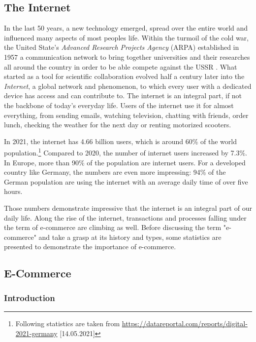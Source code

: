 \subsection{The Internet}
\label{chapter:internet}

In the last 50 years, a new technology emerged, spread over the entire world and influenced many aspects of most peoples life.
Within the turmoil of the cold war, the United State's \textit{Advanced Research Projects Agency} (ARPA) established in 1957 a communication network to bring together universities and their researches all around the country in order to be able compete against the USSR \cite{2011Cohen}.
What started as a tool for scientific collaboration evolved half a century later into the \textit{Internet}, a global network and phenomenon, to which every user with a dedicated device has access and can contribute to.
The internet is an integral part, if not the backbone of today's everyday life.
Users of the internet use it for almost everything, from sending emails, watching television, chatting with friends,  order lunch, checking the weather for the next day or renting motorized scooters.

In 2021, the internet has 4.66 billion users, which is around 60\% of the world population.\footnote{Following statistics are taken from \url{https://datareportal.com/reports/digital-2021-germany} [14.05.2021]}
Compared to 2020, the number of internet users increased by 7.3\%.
In Europe, more than 90\% of the population are internet users.
For a developed country like Germany, the numbers are even more impressing:
94\% of the German population are using the internet with an average daily time of over five hours.

Those numbers demonstrate impressive that the internet is an integral part of our daily life.
Along the rise of the internet, transactions and processes falling under the term of e-commerce are climbing as well.
Before discussing the term "e-commerce" and take a grasp at its history and types, some statistics are presented to demonstrate the importance of e-commerce.


\subsection{E-Commerce}
\label{chapter:ecommerce_subchapter}


\subsubsection{Introduction}

